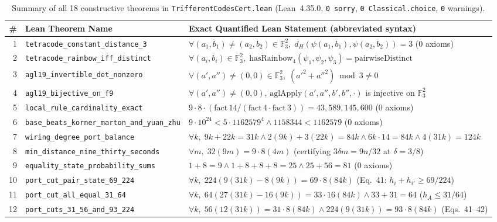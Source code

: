 \documentclass[10pt,twocolumn]{article}
\begin{document}
\begin{table}[t]
\centering
\caption{Summary of all 18 constructive theorems in \texttt{TrifferentCodesCert.lean} (Lean~4.35.0, \texttt{0 sorry}, \texttt{0 Classical.choice}, \texttt{0} warnings).}
\label{tab:lean}
\footnotesize
\begin{tabular}{@{}rll@{}}
\toprule
\# & Lean Theorem Name & Exact Quantified Lean Statement (abbreviated syntax) \\
\midrule
1 & \texttt{tetracode\_constant\_distance\_3} & $\forall (a_1,b_1) \ne (a_2,b_2) \in \mathbb{F}_3^2,\; d_H(\psi(a_1,b_1), \psi(a_2,b_2)) = 3$ (0 axioms) \\
2 & \texttt{tetracode\_rainbow\_iff\_distinct} & $\forall (a_i,b_i) \in \mathbb{F}_3^2,\; \mathrm{hasRainbow}_4(\psi_1,\psi_2,\psi_3) = \text{pairwiseDistinct}$ \\
3 & \texttt{agl19\_invertible\_det\_nonzero} & $\forall (a',a'') \ne (0,0) \in \mathbb{F}_3^2,\; (a'^2 + a''^2) \bmod 3 \ne 0$ \\
4 & \texttt{agl19\_bijective\_on\_f9} & $\forall (a',a'') \ne (0,0),\, \mathrm{aglApply}(a',a'',b',b'',\cdot)$ is injective on $\mathbb{F}_3^2$ \\
5 & \texttt{local\_rule\_cardinality\_exact} & $9 \cdot 8 \cdot (\mathrm{fact}\,14 / (\mathrm{fact}\,4 \cdot \mathrm{fact}\,3)) = 43{,}589{,}145{,}600$ (0 axioms) \\
6 & \texttt{base\_beats\_korner\_marton\_and\_yuan\_zhu} & $9 \cdot 10^{24} < 5 \cdot 1162579^4 \land 1158344 < 1162579$ (0 axioms) \\
7 & \texttt{wiring\_degree\_port\_balance} & $\forall k,\; 9k+22k=31k \land 2(9k)+3(22k)=84k \land 6k\cdot 14=84k \land 4(31k)=124k$ \\
8 & \texttt{min\_distance\_nine\_thirty\_seconds} & $\forall m,\; 32(9m) = 9 \cdot 8(4m)$ (certifying $3\delta m = 9n/32$ at $\delta=3/8$) \\
9 & \texttt{equality\_state\_probability\_sums} & $1+8=9 \land 1+8+8+8=25 \land 25+56=81$ (0 axioms) \\
10 & \texttt{port\_cut\_pair\_state\_69\_224} & $\forall k,\; 224(9(31k) - 8(9k)) = 69 \cdot 8(84k)$ (Eq.~41: $h_i + h_{i'} \ge 69/224$) \\
11 & \texttt{port\_cut\_all\_equal\_31\_64} & $\forall k,\; 64(27(31k) - 16(9k)) = 33 \cdot 16(84k) \land 33+31=64$ ($h_A \le 31/64$) \\
12 & \texttt{port\_cuts\_31\_56\_and\_93\_224} & $\forall k,\; 56(12(31k)) = 31 \cdot 8(84k) \land 224(9(31k)) = 93 \cdot 8(84k)$ (Eqs.~41--42) \\

\end{tabular}
\end{table}
\end{document}
